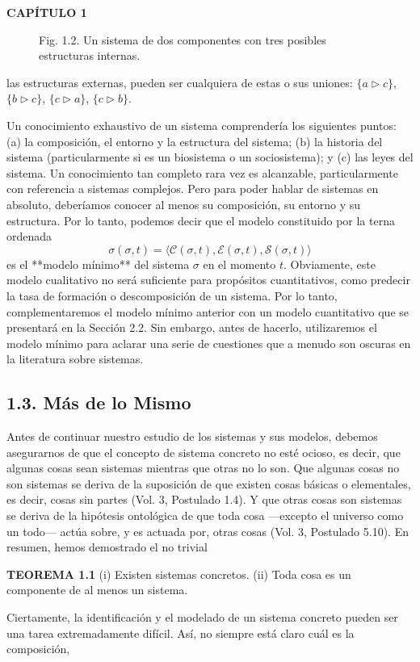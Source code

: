\newpage

\fancyhf{}
\fancyhead[l]{\thepage}
\begin{center}
{\fontsize{16}{18}\selectfont \textbf{CAPÍTULO 1}}
\end{center}
\vspace{0.5cm}

{\fontsize{13}{15}\selectfont
\begin{figure}[h!]
    \centering
    \caption*{Fig. 1.2. Un sistema de dos componentes con tres posibles estructuras internas.}
\end{figure}
las estructuras externas, pueden ser cualquiera de estas o sus uniones: $\{a \triangleright c\}$, $\{b \triangleright c\}$, $\{c \triangleright a\}$, $\{c \triangleright b\}$.

Un conocimiento exhaustivo de un sistema comprendería los siguientes puntos: (a) la composición, el entorno y la estructura del sistema; (b) la historia del sistema (particularmente si es un biosistema o un sociosistema); y (c) las leyes del sistema. Un conocimiento tan completo rara vez es alcanzable, particularmente con referencia a sistemas complejos. Pero para poder hablar de sistemas en absoluto, deberíamos conocer al menos su composición, su entorno y su estructura. Por lo tanto, podemos decir que el modelo constituido por la terna ordenada
$$ \sigma(\sigma, t) = \langle \mathcal{C}(\sigma, t), \mathcal{E}(\sigma, t), \mathcal{S}(\sigma, t) \rangle $$
es el **modelo mínimo** del sistema $\sigma$ en el momento $t$. Obviamente, este modelo cualitativo no será suficiente para propósitos cuantitativos, como predecir la tasa de formación o descomposición de un sistema. Por lo tanto, complementaremos el modelo mínimo anterior con un modelo cuantitativo que se presentará en la Sección 2.2. Sin embargo, antes de hacerlo, utilizaremos el modelo mínimo para aclarar una serie de cuestiones que a menudo son oscuras en la literatura sobre sistemas.

\subsection*{1.3. Más de lo Mismo}
Antes de continuar nuestro estudio de los sistemas y sus modelos, debemos asegurarnos de que el concepto de sistema concreto no esté ocioso, es decir, que algunas cosas sean sistemas mientras que otras no lo son. Que algunas cosas no son sistemas se deriva de la suposición de que existen cosas básicas o elementales, es decir, cosas sin partes (Vol. 3, Postulado 1.4). Y que otras cosas son sistemas se deriva de la hipótesis ontológica de que toda cosa —excepto el universo como un todo— actúa sobre, y es actuada por, otras cosas (Vol. 3, Postulado 5.10). En resumen, hemos demostrado el no trivial

\textbf{TEOREMA 1.1} (i) Existen sistemas concretos. (ii) Toda cosa es un componente de al menos un sistema.

Ciertamente, la identificación y el modelado de un sistema concreto pueden ser una tarea extremadamente difícil. Así, no siempre está claro cuál es la composición,
}
